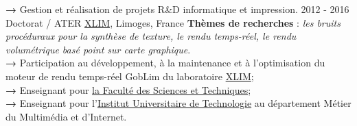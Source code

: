 \documentclass[]{friggeri-cv-a4} %
\begin{document}
\begin{entrylist}
{\textbf{→ }Gestion et réalisation de projets R\&D informatique et impression.
}
\entry
{2012 - 2016}
{Doctorat / ATER}
{\href{http://www.xlim.fr/}{XLIM}, Limoges, France}
{
\textbf{Thèmes de recherches} : \emph{les bruits procéduraux pour la synthèse de texture, le rendu temps-réel, le rendu volumétrique basé point sur carte graphique}.\\
\textbf{→ }Participation au développement, à la maintenance et à l’optimisation du moteur de
rendu temps-réel GobLim du laboratoire \href{http://www.xlim.fr/}{XLIM};\\
\textbf{→ }Enseignant pour \href{https://www.sciences.unilim.fr/}{la Faculté des Sciences et Techniques}; \\
\textbf{→ }Enseignant pour l'\href{https://www.iut.unilim.fr/}{Institut Universitaire de Technologie} au département Métier du Multimédia et d'Internet.
}
\end{entrylist}


\newpage
\end{document}
